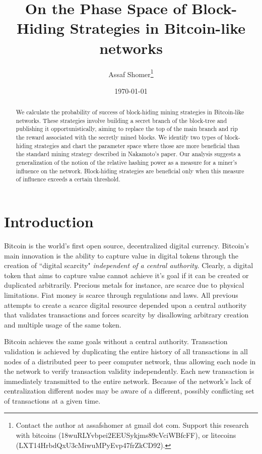 \documentclass[letterpaper,12pt]{report}
\title{\textbf{On the Phase Space of Block-Hiding Strategies in Bitcoin-like networks}}
\author{Assaf Shomer\footnote{Contact the author at assafshomer at gmail dot com. Support this research with bitcoins (18wuRLYvbpei2EEUSykjms89cVciWBfcFF), or litecoins (LXT14HrbdQxU3cMiwuMPyEvp47frZkCD92).}\\
}
\date{\today}
\begin{document}
\maketitle

\begin{abstract}
We calculate the probability of success of block-hiding mining strategies in Bitcoin-like networks.
These strategies involve building a secret branch of the block-tree and publishing it opportunistically, aiming to replace the top of the main branch and rip the reward associated with the secretly mined blocks. We identify two types of block-hiding strategies and chart the parameter space where those are more beneficial than the standard mining strategy described in Nakamoto's paper.
Our analysis suggests a generalization of the notion of the relative hashing power as a measure for a miner's influence on the network. Block-hiding strategies are beneficial only when this measure of influence exceeds a certain threshold.


\end{abstract}
\tableofcontents
\chapter{Introduction}\label{chap:intro}
Bitcoin is the world's first open source, decentralized digital currency. Bitcoin's main innovation is the ability to capture value in digital tokens through the creation of ``digital scarcity" \textit{independent of a central authority}. Clearly, a digital token that aims to capture value cannot achieve it's goal if it can be created or duplicated arbitrarily. Precious metals for instance, are scarce due to physical limitations. Fiat money is scarce through regulations and laws. All previous attempts to create a scarce digital resource depended upon a central authority that validates transactions and forces scarcity by disallowing arbitrary creation and multiple usage of the same token. 

Bitcoin achieves the same goals without a central authority. Transaction validation is achieved by duplicating the entire history of all transactions in all nodes of a distributed peer to peer computer network, thus allowing each node in the network to verify transaction validity independently. Each new transaction is immediately transmitted to the entire network. Because of the network's lack of centralization different nodes may be aware of a different, possibly conflicting set of transactions at a given time. 
\end{document}
